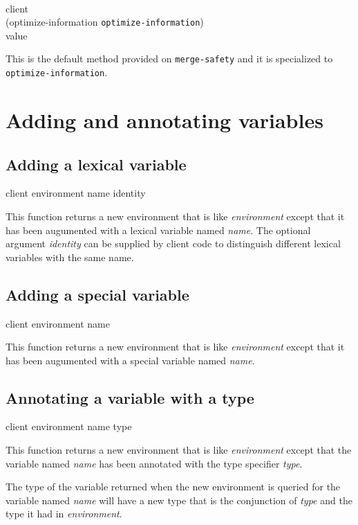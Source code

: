 \\
           {client\\
            (optimize-information {\tt optimize-information})\\
            value}

This is the default method provided on \texttt{merge-safety} and it is
specialized to \texttt{optimize-information}.

\section{Adding and annotating variables}

\subsection{Adding a lexical variable}

{\footnotesize
{} {client environment name \optional identity}
}

This function returns a new environment that is like
\textit{environment} except that it has been augumented with a lexical
variable named \textit{name}.  The optional argument \textit{identity}
can be supplied by client code to distinguish different lexical
variables with the same name.

\subsection{Adding a special variable}

{\footnotesize
{} {client environment name}
}

This function returns a new environment that is like
\textit{environment} except that it has been augumented with a special
variable named \textit{name}.

\subsection{Annotating a variable with a type}
\label{sec-annotating-a-variable-with-a-type}

{\footnotesize
{} {client environment name type}
}

This function returns a new environment that is like
\textit{environment} except that the variable named \textit{name} has
been annotated with the type specifier \textit{type}.

The type of the variable returned when the new environment is queried
for the variable named \textit{name} will have a new type that is the
conjunction of \textit{type} and the type it had in
\textit{environment}.

